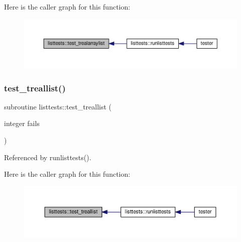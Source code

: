 Here is the caller graph for this function\+:
\nopagebreak
\begin{figure}[H]
\begin{center}
\leavevmode
\includegraphics[width=350pt]{namespacelisttests_a1261cd34c8d345e18f28b2f1a5d28fab_icgraph}
\end{center}
\end{figure}
\mbox{\label{namespacelisttests_af1d5b642102e4845be985e60d3388ad0}} 
\subsubsection{\texorpdfstring{test\+\_\+treallist()}{test\_treallist()}}
{\footnotesize\ttfamily subroutine listtests\+::test\+\_\+treallist (\begin{DoxyParamCaption}\item[{integer}]{fails }\end{DoxyParamCaption})}



Referenced by runlisttests().

Here is the caller graph for this function\+:
\nopagebreak
\begin{figure}[H]
\begin{center}
\leavevmode
\includegraphics[width=350pt]{namespacelisttests_af1d5b642102e4845be985e60d3388ad0_icgraph}
\end{center}
\end{figure}
\mbox{\label{namespacelisttests_ac1845c4c485f6e393be29fa693c91a1a}} 
